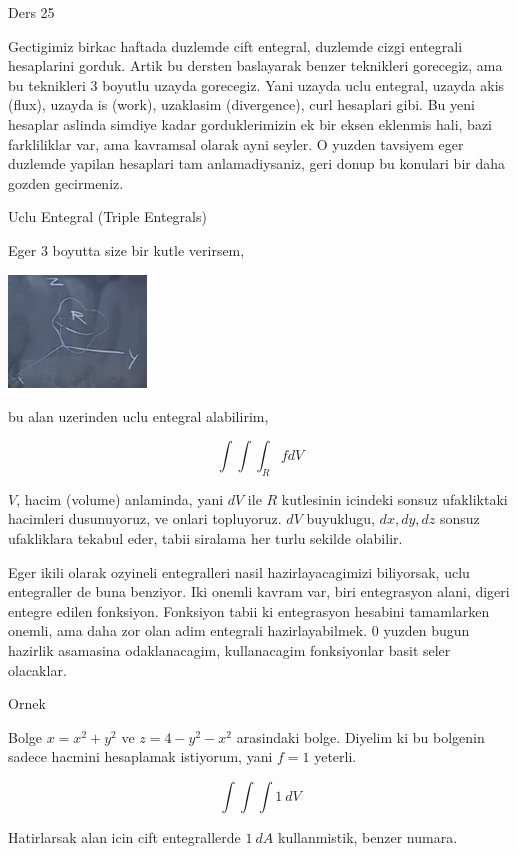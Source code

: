 \documentclass[12pt,fleqn]{article}\usepackage{../common}
\begin{document}
Ders 25

Gectigimiz birkac haftada duzlemde cift entegral, duzlemde cizgi entegrali
hesaplarini gorduk. Artik bu dersten baslayarak benzer teknikleri
gorecegiz, ama bu teknikleri 3 boyutlu uzayda gorecegiz. Yani uzayda uclu
entegral, uzayda akis (flux), uzayda is (work), uzaklasim (divergence),
curl hesaplari gibi. Bu yeni hesaplar aslinda simdiye kadar gorduklerimizin
ek bir eksen eklenmis hali, bazi farkliliklar var, ama kavramsal olarak
ayni seyler. O yuzden tavsiyem eger duzlemde yapilan hesaplari tam
anlamadiysaniz, geri donup bu konulari bir daha gozden gecirmeniz. 

Uclu Entegral (Triple Entegrals)

Eger 3 boyutta size bir kutle verirsem, 

\includegraphics[height=3cm]{25_1.png}

bu alan uzerinden uclu entegral alabilirim, 

\[ \int \int \int _R f dV \]

$V$, hacim (volume) anlaminda, yani $dV$ ile $R$ kutlesinin icindeki sonsuz
ufakliktaki hacimleri dusunuyoruz, ve onlari topluyoruz. $dV$ buyuklugu,
$dx,dy,dz$ sonsuz ufakliklara tekabul eder, tabii siralama her turlu
sekilde olabilir.

Eger ikili olarak ozyineli entegralleri nasil hazirlayacagimizi biliyorsak,
uclu entegraller de buna benziyor. Iki onemli kavram var, biri entegrasyon
alani, digeri entegre edilen fonksiyon. Fonksiyon tabii ki entegrasyon
hesabini tamamlarken onemli, ama daha zor olan adim entegrali
hazirlayabilmek. 0 yuzden bugun hazirlik asamasina odaklanacagim,
kullanacagim fonksiyonlar basit seler olacaklar. 

Ornek 

Bolge $x = x^2 + y^2$ ve $z = 4 - y^2 - x^2$ arasindaki bolge. Diyelim ki
bu bolgenin sadece hacmini hesaplamak istiyorum, yani $f = 1$ yeterli. 

\[ \int \int \int 1 \ dV \]

Hatirlarsak alan icin cift entegrallerde $1 \ dA$ kullanmistik, benzer
numara. 
\end{document}
